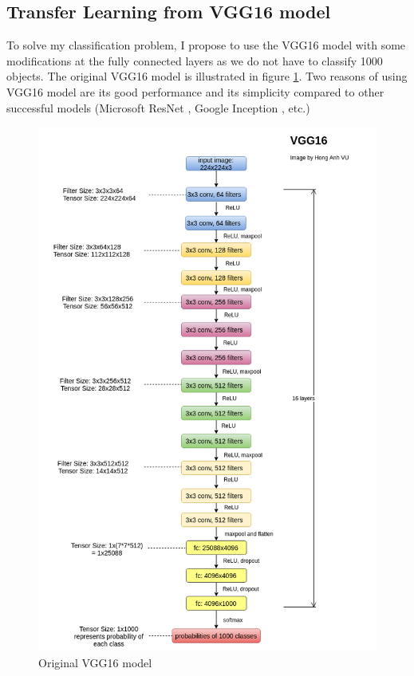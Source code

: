 \subsection{Transfer Learning from VGG16 model}
To solve my classification problem, I propose to use the VGG16 model \cite{DBLP:journals/corr/SimonyanZ14a} with some modifications at the fully connected layers as we do not have to classify 1000 objects. The original VGG16 model is illustrated in figure \ref{fig:originalVgg16}. Two reasons of using VGG16 model are its good performance and its simplicity compared to other successful models (Microsoft ResNet \cite{DBLP:journals/corr/HeZRS15}, Google Inception \cite{DBLP:journals/corr/SzegedyVISW15}, etc.)
\begin{figure}[tb]
	\centering
	\includegraphics[width=0.9\hsize]{./figures/originalVgg16}
	\caption{Original VGG16 model}
	\label{fig:originalVgg16}
\end{figure}

